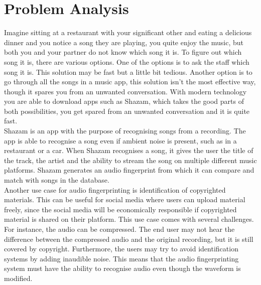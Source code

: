 \chapter{Problem Analysis}
Imagine sitting at a restaurant with your significant other and eating a delicious dinner and you notice a song they are playing, you quite enjoy the music, but both you and your partner do not know which song it is. To figure out which song it is, there are various options. One of the options is to ask the staff which song it is. This solution may be fast but a little bit tedious. Another option is to go through all the songs in a music app, this solution isn't the most effective way, though it spares you from an unwanted conversation. With modern technology you are able to download apps such as Shazam, which takes the good parts of both possibilities, you get spared from an unwanted conversation and it is quite fast.\\
Shazam is an app with the purpose of recognising songs from a recording. The app is able to recognise a song even if ambient noise is present, such as in a restaurant or a car. When Shazam recognises a song, it gives the user the title of the track, the artist and the ability to stream the song on multiple different music platforms. Shazam generates an audio fingerprint from which it can compare and match with songs in the database. \cite{ShazamDescription} \\
Another use case for audio fingerprinting is identification of copyrighted materials. This can be useful for social media where users can upload material freely, since the social media will be economically responsible if copyrighted material is shared on their platform. 
This use case comes with several challenges. For instance, the audio can be compressed. The end user may not hear the difference between the compressed audio and the original recording, but it is still covered by copyright. Furthermore, the users may try to avoid identification systems by adding inaudible noise. This means that the audio fingerprinting system must have the ability to recognise audio even though the waveform is modified. \cite{haitsma2003highly}

